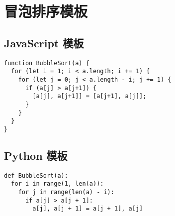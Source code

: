 \newpage
\section{冒泡排序模板}

\subsection{JavaScript 模板}

\begin{verbatim}
function BubbleSort(a) {
  for (let i = 1; i < a.length; i += 1) {
    for (let j = 0; j < a.length - i; j += 1) {
      if (a[j] > a[j+1]) {
        [a[j], a[j+1]] = [a[j+1], a[j]];
      }
    }
  }
}
\end{verbatim}

\subsection{Python 模板}

\begin{verbatim}
def BubbleSort(a):
  for i in range(1, len(a)):
    for j in range(len(a) - i):
      if a[j] > a[j + 1]:
        a[j], a[j + 1] = a[j + 1], a[j]
\end{verbatim}
